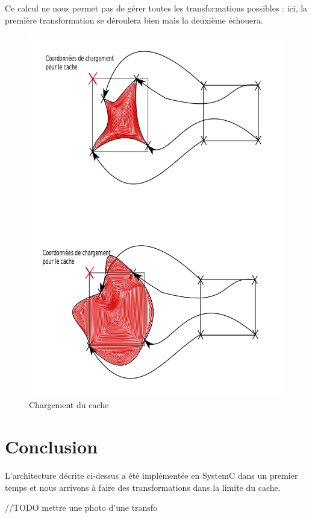 {{{Ce calcul ne nous permet pas de gérer toutes les transformations possibles : ici, la première transformation se déroulera bien mais la deuxième échouera.
\begin{figure}[!h]
	\centering
	\includegraphics[scale = 0.3]{cache_proc.png}
	\caption{Chargement du cache}
\end{figure}

}



 
    \chapter*{Conclusion}
{ L'architecture décrite ci-dessus a été implémentée en SystemC dans un premier temps et nous arrivons à faire des transformations dans la limite du cache.

//TODO mettre une photo d'une transfo

}}}
